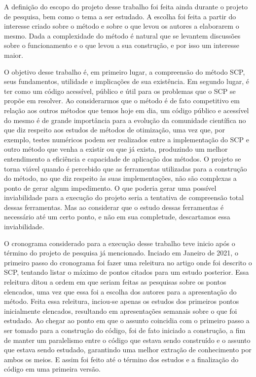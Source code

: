 

\noindent
A definição do escopo do projeto desse trabalho foi feita ainda durante o projeto de pesquisa, bem como o tema a ser estudado. A escolha foi feita a partir do interesse criado sobre o método e sobre o que levou os autores a elaborarem o mesmo. Dada a complexidade do método é natural que se levantem discussões sobre o funcionamento e o que levou a sua construção, e por isso um interesse maior.

O objetivo desse trabalho é, em primeiro lugar, a compreensão do método SCP, seus fundamentos, utilidade e implicações de sua existência. Em segundo lugar, é ter como um código acessível, público e útil para os problemas que o SCP se propõe em resolver. Ao considerarmos que o método é de fato competitivo em relação aos outros métodos que temos hoje em dia, um código público e acessível do mesmo é de grande importância para a evolução da comunidade científica no que diz respeito aos estudos de métodos de otimização, uma vez que, por exemplo, testes numéricos podem ser realizados entre a implementação do SCP e outro método que venha a existir ou que já exista, produzindo um melhor entendimento a eficiência e capacidade de aplicação dos métodos. O projeto se torna viável quando é percebido que as ferramentas utilizadas para a construção do método, no que diz respeito às suas implementações, não são complexas a ponto de gerar algum impedimento. O que poderia gerar uma possível inviabilidade para a execução do projeto seria a tentativa de compreensão total dessas ferramentas. Mas ao considerar que o estudo dessas ferramentas é necessário até um certo ponto, e não em sua completude, descartamos essa inviabilidade.

O cronograma considerado para a execução desse trabalho teve inicio após o término do projeto de pesquisa já mencionado. Inciado em Janeiro de 2021, o primeiro passo do cronograma foi fazer uma releitura no artigo onde foi descrito o SCP, tentando listar o máximo de pontos citados para um estudo posterior. Essa releitura ditou a ordem em que seriam feitas as pesquisas sobre os pontos elencados, uma vez que essa foi a escolha dos autores para a apresentação do método. Feita essa releitura, inciou-se apenas os estudos dos primeiros pontos inicialmente elencados, resultando em apresentações semanais sobre o que foi estudado. Ao chegar ao ponto em que o assunto coincidia com o primeiro passo a ser tomado para a construção do código, foi de fato iniciado a construção, a fim de manter um paralelismo entre o código que estava sendo construído e o assunto que estava sendo estudado, garantindo uma melhor extração de conhecimento por ambos os meios. E assim foi feito até o término dos estudos e a finalização do código em uma primeira versão.

